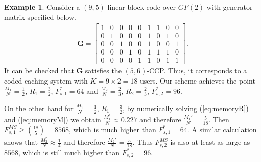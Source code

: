 \documentclass[journal,twocolumn]{IEEEtran}
\theoremstyle{definition}
\newtheorem{example}{Example}
\newcommand{\bfG}{\mathbf{G}}
\begin{document}


\begin{example}
	Consider a $(9,5)$ linear block code over $GF(2)$ with generator matrix specified below.
	\begin{align*}
	\bfG=
	\begin{bmatrix}
        1&0&0&0&0&1&1&0&0\\
        0&1&0&0&0&1&0&1&0\\
        0&0&1&0&0&1&0&0&1\\
        0&0&0&1&0&1&1&1&0\\
        0&0&0&0&1&1&0&1&1
    \end{bmatrix}.	
	\end{align*}
    It can be checked that $\bfG$ satisfies the $(5,6)$-CCP. Thus, it corresponds to a coded caching system with $K=9\times 2=18$ users. Our scheme achieves the point $\frac{M_1}{N}=\frac{1}{2}$, $R_1=\frac{3}{2}$, $F_{s,1}^*=64$ and $\frac{M_2}{N}=\frac{2}{3}$, $R_2=\frac{2}{3}$, $F_{s,2}^*=96$.

    On the other hand for $\frac{M_1}{N}=\frac{1}{2}$, $R_1=\frac{3}{2}$, by numerically solving  (\ref{eq:memoryR}) and (\ref{eq:memoryM}) we obtain $\frac{M_1^*}{N}\approx 0.227$ and therefore $\frac{M_1'}{N}=\frac{5}{18}$. Then $F_{s,1}^{MS}\ge\binom{18}{5}=8568$, which is much higher than $F_{s,1}^*=64$. A similar calculation shows that $\frac{M_2^*}{N}\approx \frac{1}{4}$ and therefore $\frac{M_2'}{N}=\frac{5}{18}$. Thus  $F_{s,2}^{MS}$ is also at least as large as $8568$, which is still much higher than $F_{s,2}^*=96$.
\end{example}
\end{document}

